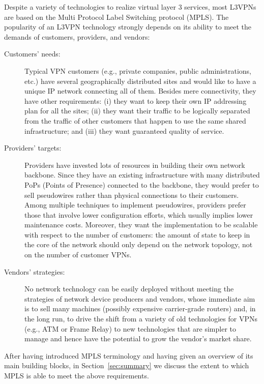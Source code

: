 \documentclass{article}
\begin{document}
Despite a variety of technologies to realize virtual layer 3 services, most 
L3VPNs are based on the Multi Protocol Label Switching protocol (MPLS). The 
popularity of an L3VPN technology strongly depends on its ability to meet the 
demands of customers, providers, and vendors:
\begin{description}

\item[Customers' needs:]

Typical VPN customers (e.g., private companies, public administrations, etc.) have several 
geographically distributed sites and would like to have a unique IP network 
connecting all of them. Besides mere connectivity, they have other 
requirements: (i) they want to keep their own IP addressing plan for all 
the sites;  (ii) they want their traffic to be logically separated from the 
traffic of other customers that happen to use the same shared infrastructure; 
and (iii) they want guaranteed quality of service.

\item[Providers' targets:]

Providers have invested lots of resources in building their own network 
backbone. Since they have an existing infrastructure with many distributed PoPs 
(Points of Presence) connected to the backbone, they would prefer to sell 
pseudowires rather than physical connections to their customers.  Among multiple techniques to implement 
pseudowires, providers prefer those that involve lower configuration efforts, 
which usually implies lower maintenance costs. Moreover, they want the 
implementation to be scalable with respect to the number of customers: the 
amount of state to keep in the core of the network should only depend on the 
network topology, not on the number of customer VPNs.

\item[Vendors' strategies:]

No network technology can be easily deployed without meeting the strategies of 
network device producers and vendors, whose immediate aim is to sell many 
machines (possibly expensive carrier-grade routers) and, in the long run, to 
drive the shift from a variety of old technologies for VPNs (e.g., ATM or 
Frame Relay) to new technologies that are simpler to manage and hence have the 
potential to grow the vendor's market share.
\end{description}

After having introduced MPLS terminology and having given an overview of its
main building blocks, in Section~\ref{sec:summary} we discuss the extent to 
which MPLS is able to meet the above requirements.
\end{document}
